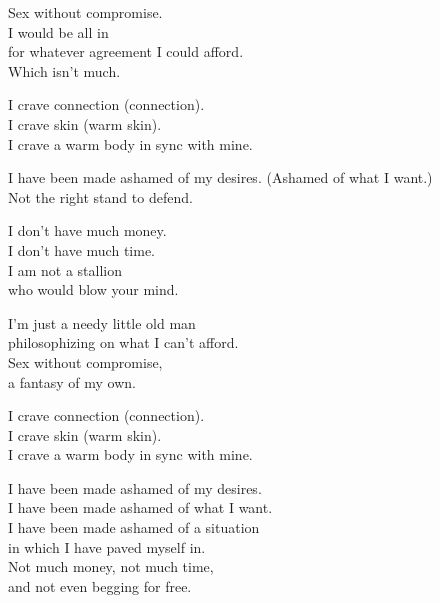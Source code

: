 \begin{lyrics}
Sex without compromise.\\
I would be all in\\
for whatever agreement I could afford.\\
Which isn’t much.

I crave connection (connection).\\
I crave skin (warm skin).\\
I crave a warm body in sync with mine.

I have been made ashamed of my desires.
(Ashamed of what I want.)\\
Not the right stand to defend.

I don’t have much money.\\
I don’t have much time.\\
I am not a stallion\\
who would blow your mind.

I’m just a needy little old man\\
philosophizing on what I can’t afford.\\
Sex without compromise,\\
a fantasy of my own.

I crave connection (connection).\\
I crave skin (warm skin).\\
I crave a warm body in sync with mine.

I have been made ashamed of my desires.\\
I have been made ashamed of what I want.\\
I have been made ashamed of a situation\\
in which I have paved myself in.\\
Not much money, not much time,\\
and not even begging for free.
\end{lyrics}

